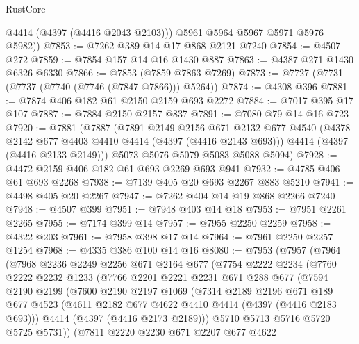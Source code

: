 \begin{lexlean}{RustCore}
\begin{coremodule}
          @4414
          (@4397 (@4416 @2043 @2103)))
        @5961
        @5964
        @5967
        @5971
        @5976
        @5982))
@7853 := @7262 @389 @14 @17 @868 @2121 @7240
@7854 := @4507 @272
@7859 := @7854 @157 @14 @16 @1430 @887
@7863 := @4387 @271 @1430 @6326 @6330
@7866 := @7853 (@7859 @7863 @7269)
@7873 := @7727 (@7731 (@7737 (@7740 (@7746 (@7847 @7866))) @5264))
@7874 := @4308 @396
@7881 := @7874 @406 @182 @61 @2150 @2159 @693 @2272
@7884 := @7017 @395 @17 @107
@7887 := @7884 @2150 @2157 @837
@7891 := @7080 @79 @14 @16 @723
@7920 := @7881
    (@7887
      (@7891
        @2149
        @2156
        @671
        @2132
        @677
        @4540
        (@4378 @2142 @677 @4403 @4410 @4414 (@4397 (@4416 @2143 @693)))
        @4414
        (@4397 (@4416 @2133 @2149)))
      @5073
      @5076
      @5079
      @5083
      @5088
      @5094)
@7928 := @4472 @2159 @406 @182 @61 @693 @2269 @693 @941
@7932 := @4785 @406 @61 @693 @2268
@7938 := @7139 @405 @20 @693 @2267 @883 @5210
@7941 := @4498 @405 @20 @2267
@7947 := @7262 @404 @14 @19 @868 @2266 @7240
@7948 := @4507 @399
@7951 := @7948 @403 @14 @18
@7953 := @7951 @2261 @2265
@7955 := @7174 @399 @14
@7957 := @7955 @2250 @2259
@7958 := @4322 @203
@7961 := @7958 @398 @17 @14
@7964 := @7961 @2250 @2257 @1254
@7968 := @4335 @386 @100 @14 @16
@8080 := @7953
    (@7957
      (@7964
        (@7968
          @2236
          @2249
          @2256
          @671
          @2164
          @677
          (@7754
            @2222
            @2234
            (@7760
              @2222
              @2232
              @1233
              (@7766
                @2201
                @2221
                @2231
                @671
                @288
                @677
                (@7594
                  @2190
                  @2199
                  (@7600
                    @2190
                    @2197
                    @1069
                    (@7314
                      @2189
                      @2196
                      @671
                      @189
                      @677
                      @4523
                      (@4611 @2182 @677 @4622 @4410 @4414 (@4397 (@4416 @2183 @693)))
                      @4414
                      (@4397 (@4416 @2173 @2189)))
                    @5710
                    @5713
                    @5716
                    @5720
                    @5725
                    @5731))
                (@7811
                  @2220
                  @2230
                  @671
                  @2207
                  @677
                  @4622

\end{coremodule}
\end{lexlean}
